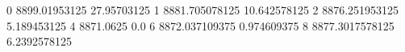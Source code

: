 0 8899.01953125 27.95703125
1 8881.705078125 10.642578125
2 8876.251953125 5.189453125
4 8871.0625 0.0
6 8872.037109375 0.974609375
8 8877.3017578125 6.2392578125
